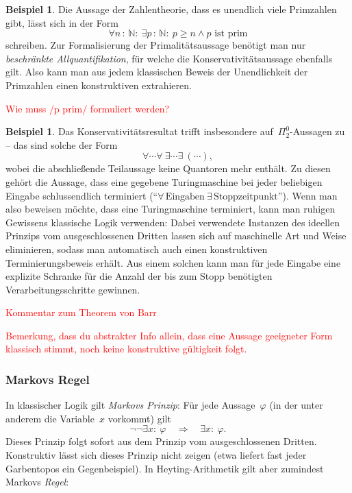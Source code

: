 \documentclass[a4paper,ngerman,12pt]{scrartcl}
\theoremstyle{definition}
\newtheorem{bsp}[defn]{Beispiel}
\theoremstyle{plain}
\theoremstyle{remark}
\newcommand{\NN}{\mathbb{N}}
\renewcommand{\_}{\mathpunct{.}\,}
\newcommand{\?}{\,{:}\,}
\newcommand{\XXX}[1]{\textcolor{red}{#1}}
\begin{document}
\begin{bsp}Die Aussage der Zahlentheorie, dass es unendlich viele Primzahlen
gibt, lässt sich in der Form
\[ \forall n\?\NN{:}\ \exists p\?\NN{:}\ p \geq n \wedge \text{$p$ ist prim} \]
schreiben. Zur Formalisierung der Primalitätsaussage benötigt man nur
\emph{beschränkte Allquantifikation}, für welche die Konservativitätsaussage
ebenfalls gilt. Also kann man aus jedem klassischen Beweis der Unendlichkeit
der Primzahlen einen konstruktiven extrahieren.
\end{bsp}
\XXX{Wie muss /p prim/ formuliert werden?}

\begin{bsp}Das Konservativitätsresultat trifft insbesondere
auf~$\Pi^0_2$-Aussagen zu -- das sind solche der Form
\[ \forall \cdots \forall\ \exists \cdots \exists\ (\cdots), \]
wobei die abschließende Teilaussage keine Quantoren mehr enthält. Zu diesen
gehört die Aussage, dass eine gegebene Turingmaschine bei jeder
beliebigen Eingabe schlussendlich terminiert ("`$\forall\,\text{Eingaben}\
\exists\,\text{Stoppzeitpunkt}$"'). Wenn man also beweisen möchte, dass eine
Turingmaschine terminiert, kann man ruhigen Gewissens klassische Logik
verwenden: Dabei verwendete Instanzen des ideellen Prinzips vom ausgeschlossenen Dritten
lassen sich auf maschinelle Art und Weise eliminieren, sodass man automatisch
auch einen konstruktiven Terminierungsbeweis erhält. Aus einem solchen kann man
für jede Eingabe eine explizite Schranke für die Anzahl der bis zum Stopp
benötigten Verarbeitungsschritte gewinnen.
\end{bsp}

\XXX{Kommentar zum Theorem von Barr}

\XXX{Bemerkung, dass du abstrakter Info allein, dass eine Aussage geeigneter
Form klassisch stimmt, noch keine konstruktive gültigkeit folgt.}


\subsubsection*{Markovs Regel}

In klassischer Logik gilt \emph{Markovs Prinzip}: Für jede Aussage~$\varphi$
(in der unter anderem die Variable~$x$ vorkommt) gilt
\[ \neg\neg \exists x{:}\ \varphi \quad\Longrightarrow\quad
  \exists x{:}\ \varphi. \]
Dieses Prinzip folgt sofort aus dem Prinzip vom ausgeschlossenen Dritten.
Konstruktiv lässt sich dieses Prinzip nicht zeigen (etwa liefert fast jeder
Garbentopos ein Gegenbeispiel). In Heyting-Arithmetik gilt aber zumindest
Markovs \emph{Regel}:
\end{document}
